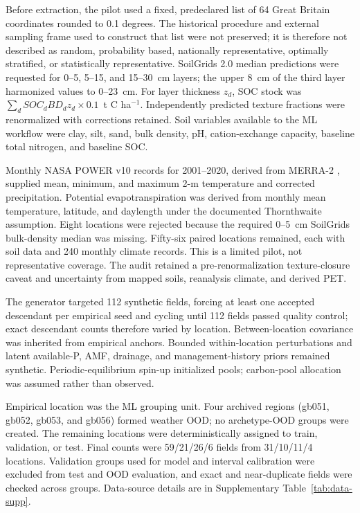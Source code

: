 \documentclass[11pt]{article}
\newcommand{\unitC}{t C ha$^{-1}$}
\begin{document}
Before extraction, the pilot used a fixed, predeclared list of 64 Great Britain coordinates rounded to 0.1 degrees. The historical procedure and external sampling frame used to construct that list were not preserved; it is therefore not described as random, probability based, nationally representative, optimally stratified, or statistically representative. SoilGrids 2.0 median predictions \citep{poggio2021soilgrids} were requested for 0--5, 5--15, and 15--30~cm layers; the upper 8~cm of the third layer harmonized values to 0--23~cm. For layer thickness $z_d$, SOC stock was $\sum_d SOC_d BD_d z_d\times0.1$~\unitC. Independently predicted texture fractions were renormalized with corrections retained. Soil variables available to the ML workflow were clay, silt, sand, bulk density, pH, cation-exchange capacity, baseline total nitrogen, and baseline SOC.

Monthly NASA POWER v10 records for 2001--2020, derived from MERRA-2 \citep{gelaro2017merra2}, supplied mean, minimum, and maximum 2-m temperature and corrected precipitation. Potential evapotranspiration was derived from monthly mean temperature, latitude, and daylength under the documented Thornthwaite assumption. Eight locations were rejected because the required 0--5~cm SoilGrids bulk-density median was missing. Fifty-six paired locations remained, each with soil data and 240 monthly climate records. This is a limited pilot, not representative coverage. The audit retained a pre-renormalization texture-closure caveat and uncertainty from mapped soils, reanalysis climate, and derived PET.

The generator targeted 112 synthetic fields, forcing at least one accepted descendant per empirical seed and cycling until 112 fields passed quality control; exact descendant counts therefore varied by location. Between-location covariance was inherited from empirical anchors. Bounded within-location perturbations and latent available-P, AMF, drainage, and management-history priors remained synthetic. Periodic-equilibrium spin-up initialized pools; carbon-pool allocation was assumed rather than observed.

Empirical location was the ML grouping unit. Four archived regions (gb051, gb052, gb053, and gb056) formed weather OOD; no archetype-OOD groups were created. The remaining locations were deterministically assigned to train, validation, or test. Final counts were 59/21/26/6 fields from 31/10/11/4 locations. Validation groups used for model and interval calibration were excluded from test and OOD evaluation, and exact and near-duplicate fields were checked across groups. Data-source details are in Supplementary Table~\ref{tab:data-supp}.
\end{document}
